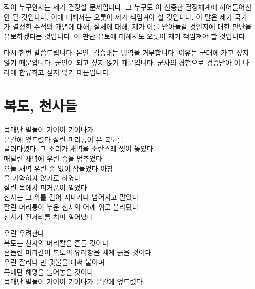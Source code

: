 \documentclass[12pt, b6paper, openany]{memoir}
\newenvironment{lyric}{\setlength{\parindent}{0pt}}{}
\newenvironment{article}{}{}
\begin{document}
\begin{article}
    적이 누구인지는 제가 결정할 문제입니다. 그 누구도 이 신중한 결정체계에 끼어들어선 안 될 것입니다. 이에 대해서는 오롯이 제가 책임져야 할 것입니다. 이 말은 제가 국가가 결정한 주적의 개념에 대해, 실체에 대해, 제가 이를 받아들일 것인지에 대한 판단을 유보하겠다는 것입니다. 이 판단 유보에 대해서도 오롯이 제가 책임져야 할 것입니다.
    
    다시 한번 말씀드립니다. 본인, 김승해는 병역을 거부합니다. 이유는 군대에 가고 싶지 않기 때문입니다. 군인이 되고 싶지 않기 때문입니다. 군사의 경험으로 검증받아 이 나라에 합류하고 싶지 않기 때문입니다.
    \end{article}
    
    \begin{lyric}
    \hypertarget{uxbcf5uxb3c4-uxcc9cuxc0acuxb4e4}{%
    \chapter{복도, 천사들}\label{uxbcf5uxb3c4-uxcc9cuxc0acuxb4e4}}
    
    목매단 말들이 기어이 기어나가\\
    문간에 엎드렸다 잘린 머리통이 온 복도를\\
    굴러다녔다. 그 소리가 새벽을 소란스레 찢어 놓았다\\
    매달린 새벽에 우린 숨을 멈추었다\\
    오늘 새벽 우린 숨 없이 잠들었다 아침\\
    을 기약하지 않기로 하였다\\
    잘린 목에서 피거품이 일었다\\
    천사는 그 위를 걸어 지나가다 넘어지고 말았다\\
    잘린 머리통이 누운 천사의 어깨 위로 올라탔다\\
    천사가 진저리를 치며 일어났다
    
    우린 우려한다\\
    복도는 천사의 머리칼을 흔들 것이다\\
    흔들린 머리칼이 복도의 유리창을 세게 긁을 것이다\\
    우린 잘리다 만 귓불을 애써 붙이며\\
    목매단 해명을 늘어놓을 것이다\\
    목매단 말들이 기어이 기어나가 문간에 엎드렸다.
    \end{lyric}
    
\end{document}
